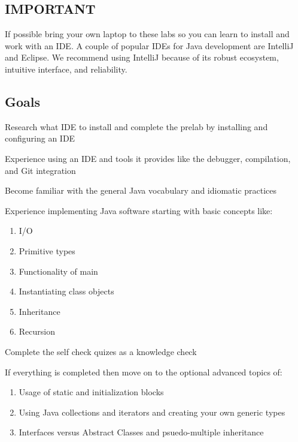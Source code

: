 \documentclass[../../main.tex]{subfiles}
\begin{document}
\subsection{IMPORTANT}
If possible bring your own laptop to these labs so you can learn
to install and work with an IDE. A couple of popular IDEs for Java
development are IntelliJ and Eclipse. We recommend using IntelliJ
because of its robust ecosystem, intuitive interface, and reliability.

\subsection{Goals}

\begin{steps}
   \item Research what IDE to install and complete the prelab by installing and configuring an IDE
   \item Experience using an IDE and tools it provides like the debugger, compilation, and Git integration
   \item Become familiar with the general Java vocabulary and idiomatic practices
   \item Experience implementing Java software starting with basic concepts like:
   \begin{enumerate}[label=\Alph*.]
         \item I/O
         \item Primitive types
         \item Functionality of main
         \item Instantiating class objects
         \item Inheritance
         \item Recursion
   \end{enumerate}
   \item Complete the self check quizes as a knowledge check
   \item If everything is completed then move on to the optional advanced topics of:
   \begin{enumerate}[label=\Alph*.]
         \item Usage of static and initialization blocks
         \item Using Java collections and iterators and creating your own generic types
         \item Interfaces versus Abstract Classes and psuedo-multiple inheritance
      \end{enumerate}
\end{steps}
\end{document}
